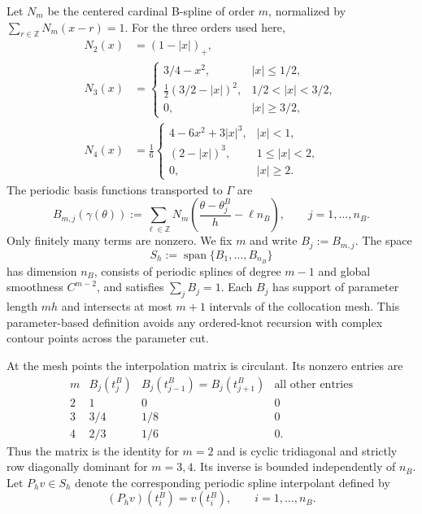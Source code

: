 \documentclass[11pt,a4paper]{amsart}
\theoremstyle{plain}
\theoremstyle{definition}
\theoremstyle{remark}
\newcommand{\Ga}{\Gamma}
\newcommand{\spanop}{\operatorname{span}}
\begin{document}
Let $N_m$ be the centered cardinal B-spline of order $m$, normalized by $\sum_{r\in\mathbb Z}N_m(x-r)=1$.  For the three orders used here,
\begin{align*}
 N_2(x)&=(1-|x|)_+,\\
 N_3(x)&=
 \begin{cases}
 3/4-x^2,&|x|\le1/2,\\
 \tfrac12(3/2-|x|)^2,&1/2<|x|<3/2,\\
 0,&|x|\ge3/2,
 \end{cases}\\
 N_4(x)&=\frac16
 \begin{cases}
 4-6x^2+3|x|^3,&|x|<1,\\
 (2-|x|)^3,&1\le|x|<2,\\
 0,&|x|\ge2.
 \end{cases}
\end{align*}
The periodic basis functions transported to $\Ga$ are
\begin{equation}\label{eq:periodicB}
        B_{m,j}(\gamma(\theta))
        :=\sum_{\ell\in\mathbb Z}
        N_m\!\left(\frac{\theta-\theta_j^B}{h}-\ell n_B\right),
        \qquad j=1,\ldots,n_B.
\end{equation}
Only finitely many terms are nonzero.  We fix $m$ and write $B_j:=B_{m,j}$.  The space
\[
        S_h:=\spanop\{B_1,\ldots,B_{n_B}\}
\]
has dimension $n_B$, consists of periodic splines of degree $m-1$ and global smoothness $C^{m-2}$, and satisfies $\sum_jB_j=1$.  Each $B_j$ has support of parameter length $mh$ and intersects at most $m+1$ intervals of the collocation mesh.  This parameter-based definition avoids any ordered-knot recursion with complex contour points across the parameter cut.

At the mesh points the interpolation matrix is circulant.  Its nonzero entries are
\begin{equation}\label{eq:collocationB}
\begin{array}{c|ccc}
 m & B_j(t_j^B) & B_j(t_{j-1}^B)=B_j(t_{j+1}^B) & \text{all other entries}\\
 \hline
 2 & 1 & 0 & 0\\
 3 & 3/4 & 1/8 & 0\\
 4 & 2/3 & 1/6 & 0.
\end{array}
\end{equation}
Thus the matrix is the identity for $m=2$ and is cyclic tridiagonal and strictly row diagonally dominant for $m=3,4$.  Its inverse is bounded independently of $n_B$.  Let $P_hv\in S_h$ denote the corresponding periodic spline interpolant defined by
\begin{equation}\label{eq:interpolation}
        (P_hv)(t_i^B)=v(t_i^B),
        \qquad i=1,\ldots,n_B.
\end{equation}
\end{document}
